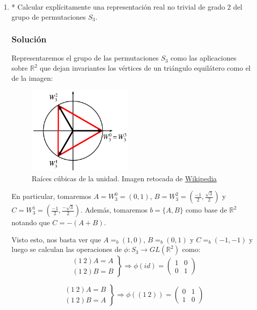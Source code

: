 \documentclass[paper=a4, fontsize=11pt, spanish]{scrartcl}
\begin{document}
\begin{enumerate}
		\item * Calcular explícitamente una representación real no trivial de grado 2 del grupo de permutaciones
		$S_3$.
		\subsubsection*{Solución}
		Representaremos el grupo de las permutaciones $S_3$ como las aplicaciones sobre $\mathbb{R}^2$ que dejan
		invariantes los vértices de un triángulo equilátero como el de la imagen:
		
		\begin{figure}[H]
			\centering
			\includegraphics[width=5cm]{./3rd-roots-of-unity.png}
			\caption{Raíces cúbicas de la unidad. Imagen retocada de
			\href{https://upload.wikimedia.org/wikipedia/commons/3/3a/3rd-roots-of-unity.png}{Wikipedia}}
		\end{figure}
		
		En particular, tomaremos $A = W_3^0 = (0, 1)$, $\displaystyle B = W_3^2 = \left(\frac{-1}{2},
		\frac{\sqrt{3}}{2}\right)$ y $\displaystyle C = W_3^1 = \left(\frac{-1}{2}, \frac{-\sqrt{3}}{2}\right)$.
		Además, tomaremos $b=\{A, B\}$ como base de $\mathbb{R}^2$ notando que $C = -(A+B)$.
		
		Visto esto, nos basta ver que $A =_b (1, 0)$, $B =_b (0, 1)$ y $C =_b (-1, -1)$ y luego se calculan las
		operaciones de $\phi: S_3 \rightarrow GL\left(\mathbb{R}^2\right)$ como:
		$$\left.\begin{aligned}
			(1\ 2)A = A\\
			(1\ 2)B = B
		\end{aligned}\right\} \Rightarrow\phi(id) = \begin{pmatrix} 1 & 0\\ 0 & 1 \end{pmatrix}$$
		
		$$\left.\begin{aligned}
			(1\ 2)A = B\\
			(1\ 2)B = A
		\end{aligned}\right\} \Rightarrow \phi((1\ 2)) = \begin{pmatrix} 0 & 1\\ 1 & 0 \end{pmatrix}$$
		

\end{enumerate}
\end{document}
